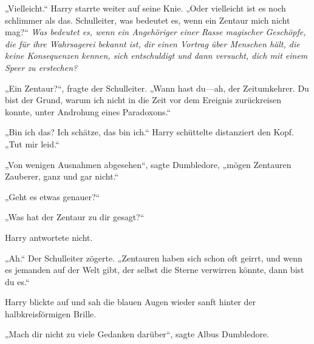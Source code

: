 „Vielleicht.“ Harry starrte weiter auf seine Knie. „Oder vielleicht ist es noch schlimmer als das. Schulleiter, was bedeutet es, wenn ein Zentaur mich nicht mag?“
\emph{Was bedeutet es, wenn ein Angehöriger einer Rasse magischer Geschöpfe, die für ihre Wahrsagerei bekannt ist, dir einen Vortrag über Menschen hält, die keine Konsequenzen kennen, sich entschuldigt und dann versucht, dich mit einem Speer zu erstechen?}

„Ein Zentaur?“, fragte der Schulleiter. „Wann hast du—ah, der Zeitumkehrer. Du bist der Grund, warum ich nicht in die Zeit vor dem Ereignis zurückreisen konnte, unter Androhung eines Paradoxons.“

„Bin ich das? Ich schätze, das bin ich.“ Harry schüttelte distanziert den Kopf. „Tut mir leid.“

„Von wenigen Ausnahmen abgesehen“, sagte Dumbledore, „mögen Zentauren Zauberer, ganz und gar nicht.“

„Geht es etwas genauer?“

„Was hat der Zentaur zu dir gesagt?“

Harry antwortete nicht.

„Ah.“ Der Schulleiter zögerte. „Zentauren haben sich schon oft geirrt, und wenn es jemanden auf der Welt gibt, der selbst die Sterne verwirren könnte, dann bist du es.“

Harry blickte auf und sah die blauen Augen wieder sanft hinter der halbkreisförmigen Brille.

„Mach dir nicht zu viele Gedanken darüber“, sagte Albus Dumbledore.

